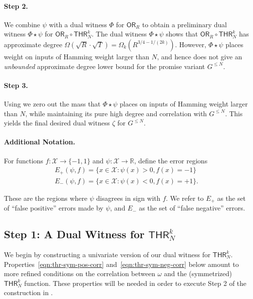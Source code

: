 \documentclass[11pt, letterpaper, fleqn]{article}
\theoremstyle{plain}
\newcommand{\OR}{\mathsf{ OR}}
\newcommand{\THR}{\mathsf{THR}}
\newcommand{\bits}{\{-1,1\}}
\newcommand{\promcomp}{G^{\le N}}
\newcommand{\ls}{\star}
\newcommand{\cX}{\mathcal{X}}
\begin{document}
\paragraph{Step 2.} We combine $\psi$ with a dual witness $\Phi$ for $\OR_R$ to obtain a preliminary dual witness $\Phi \ls \psi$ for $\OR_R \circ \THR_N^k$. The dual witness $\Phi \ls \psi$ shows that $\OR_R \circ \THR^k_N$ has approximate degree $\Omega(\sqrt{R} \cdot \sqrt{T}) = \Omega_k(R^{3/4 - 1/(2k)})$. However, $\Phi \ls \psi$ places weight on inputs of Hamming weight larger than $N$, and hence does not give an \emph{unbounded} approximate degree lower bound for the promise variant $\promcomp$.

\paragraph{Step 3.} Using  we zero out the mass that $\Phi \ls \psi$ places on inputs of  Hamming weight larger than $N$, while maintaining its pure high degree and correlation with $\promcomp$. This yields the final desired dual witness $\zeta$ for $\promcomp$.


\paragraph{Additional Notation.}

For functions $f : \cX \to \bits$ and $\psi : \cX \to \mathbb{R}$, define the error regions
\begin{align*}
E_+(\psi, f) = \{x \in \cX : \psi(x) > 0, f(x) = -1\} \\
E_-(\psi, f) = \{x \in \cX : \psi(x) < 0, f(x) = +1\}.
\end{align*}

These are the regions where $\psi$ disagrees in sign with $f$. 
We refer to $E_+$ as the set of ``false positive'' errors made by $\psi$,
and $E_-$ as the set of ``false negative'' errors.



\subsection{Step 1: A Dual Witness for \texorpdfstring{$\THR^k_N$}{THR}}


We begin by constructing a univariate version of our dual witness for $\THR^k_N$. Properties~\eqref{eqn:thr-sym-pos-corr} and~\eqref{eqn:thr-sym-neg-corr} below amount to more refined conditions on the correlation between $\omega$ and the (symmetrized) $\THR^k_N$ function. These properties will be needed in order to execute Step 2 of the construction in .
\end{document}
